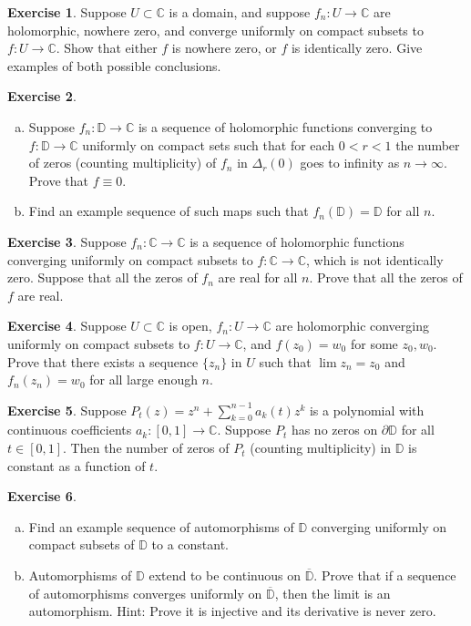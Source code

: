 \documentclass[12pt,openany]{book}
\newcommand{\C}{{\mathbb{C}}}
\newcommand{\D}{{\mathbb{D}}}
\theoremstyle{plain}
\theoremstyle{remark}
\theoremstyle{definition}
\newenvironment{exbox}{%
    \def\FrameCommand{\vrule width 1pt \relax\hspace{10pt}}%
    \MakeFramed{\advance\hsize-\width\FrameRestore}%
}{%
    \endMakeFramed
}
\newenvironment{exparts}{%
    \leavevmode\begin{enumerate}[a),noitemsep,topsep=0pt,parsep=0pt,partopsep=0pt]
}{%
    \end{enumerate}
}
\theoremstyle{exercise}
\newtheorem{exercise}{Exercise}[section]
\theoremstyle{example}
\begin{document}
\begin{exbox}
\begin{exercise}
Suppose $U \subset \C$ is a domain,
and suppose
$f_n \colon U \to \C$ are holomorphic, nowhere zero,
and converge uniformly on compact subsets to $f \colon U \to \C$.
Show that either $f$ is nowhere zero, or $f$ is identically zero.
Give examples of both possible conclusions.
\end{exercise}

\begin{exercise}
\begin{exparts}
\item
Suppose $f_n \colon \D \to \C$ is a sequence of holomorphic functions converging
to $f \colon \D \to \C$ uniformly on compact sets such that
for each $0 < r < 1$ the number of zeros (counting multiplicity)
of $f_n$ in $\Delta_r(0)$ goes to infinity as $n \to \infty$.
Prove that $f \equiv 0$.
\item
Find an example sequence of such maps such that $f_n(\D) = \D$
for all $n$.
\end{exparts}
\end{exercise}

\begin{exercise}
Suppose 
$f_n \colon \C \to \C$ is a sequence of holomorphic
functions
converging uniformly on compact subsets to $f \colon \C \to \C$,
which is not identically zero.
Suppose that all the zeros of $f_n$ are real for all $n$.
Prove that all the zeros of $f$ are real.
\end{exercise}

\begin{exercise}
Suppose $U \subset \C$ is open,
$f_n \colon U \to \C$ are holomorphic
converging uniformly on compact subsets to $f \colon U \to \C$,
and $f(z_0) = w_0$ for some $z_0, w_0$.  
Prove that there exists a sequence $\{ z_n \}$ in $U$ such that
$\lim z_n = z_0$ and $f_n(z_n) = w_0$ for all large enough $n$.
\end{exercise}

\begin{exercise}
Suppose $P_t(z) = z^n + \sum_{k=0}^{n-1} a_k(t) z^k$ is a polynomial
with continuous coefficients $a_k \colon [0,1] \to \C$.  Suppose $P_t$ has
no zeros on $\partial \D$ for all $t \in [0,1]$.  Then the number of zeros
of $P_t$ (counting multiplicity) in $\D$ is constant as a function of $t$.
\end{exercise}

\begin{exercise}
\begin{exparts}
\item
Find an example sequence of automorphisms of $\D$ converging
uniformly on compact subsets of $\D$ to a constant.
\item
Automorphisms of $\D$ extend to be continuous on
$\overline{\D}$.  Prove that if a sequence
of automorphisms converges uniformly on $\overline{\D}$, then
the limit is an automorphism. Hint: Prove it is injective
and its derivative is never zero.
\end{exparts}
\end{exercise}


\end{exbox}
\end{document}
